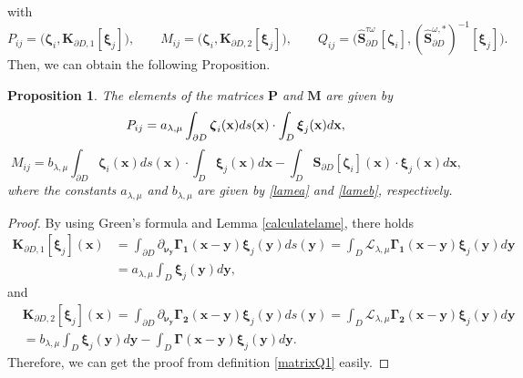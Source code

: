\documentclass[10pt,reqno,oneside]{amsart}%
\newtheorem{prop}{Proposition}[section]
\theoremstyle{definition}
\theoremstyle{remark}
\numberwithin{equation}{section}
\numberwithin{equation}{section}
\begin{document}
with
\begin{equation}\label{matrixQ1}
P_{ij}=\Big(\boldsymbol{\zeta}_i,\mathbf{K}_{\partial D,1}[\boldsymbol{\xi}_j]\Big),\quad\quad
M_{ij}=\Big(\boldsymbol{\zeta}_i,\mathbf{K}_{\partial D,2}[\boldsymbol{\xi}_j]\Big),\quad\quad
Q_{ij}=\Big(\hat{\mathbf{S}}_{\partial D}^{{\tau\omega} }[\boldsymbol{\zeta}_i],(\hat{\mathbf{S}}_{\partial D}^{{\omega},* })^{-1}[\boldsymbol{\xi}_j]\Big).
\end{equation}
Then, we can obtain the following Proposition.
\begin{prop}\label{matrices p and m}
The elements of the matrices $\mathbf{P}$ and $\mathbf{M}$ are given by
$$
P_{ij}=a_{\lambda,\mu}\int_{ \partial D}\boldsymbol{\zeta}_i(\mathbf{x})ds(\mathbf{x})\cdot \int_{ D}\boldsymbol{\xi}_j(\mathbf{x})d\mathbf{x},\quad\\
$$
$$
M_{ij}={b}_{\lambda,\mu}\int_{ \partial D}\boldsymbol{\zeta}_i(\mathbf{x})ds(\mathbf{x}) \cdot\int_{ D}\boldsymbol{\xi}_j(\mathbf{x})d\mathbf{x}
-\int_{ D} {\mathbf{S}}_{\partial D}[\boldsymbol{\zeta}_i](\mathbf{x}) \cdot \boldsymbol{\xi}_j(\mathbf{x}) d\mathbf{x},
$$
where the constants ${a}_{\lambda,\mu}$ and ${b}_{\lambda,\mu}$ are given by \eqref{lamea} and \eqref{lameb}, respectively.
\end{prop}
\begin{proof}
By using Green's formula and Lemma \ref{calculatelame}, there holds
\begin{align}
\mathbf{K}_{\partial D,1}[\boldsymbol{\xi}_j](\mathbf{x})&=\int_{\partial D}\partial_{\boldsymbol{\nu}_{\mathbf{y}}} \boldsymbol{\Gamma_1}(\mathbf{x}-\mathbf{y})\boldsymbol{\xi}_j(\mathbf{y})d s(\mathbf{y})=\int_{ D} \mathcal{L}_{\lambda,\mu} \boldsymbol{\Gamma_1}(\mathbf{x}-\mathbf{y})\boldsymbol{\xi}_j(\mathbf{y})d\mathbf{y}\nonumber\\
&=a_{\lambda,\mu}\int_{ D}\boldsymbol{\xi}_j(\mathbf{y})d\mathbf{y},\nonumber
\end{align}
and
\begin{align}
&\mathbf{K}_{\partial D,2}[\boldsymbol{\xi}_j](\mathbf{x})=\int_{\partial D}\partial_{\boldsymbol{\nu}_{\mathbf{y}}} \boldsymbol{\Gamma_2}(\mathbf{x}-\mathbf{y})\boldsymbol{\xi}_j(\mathbf{y})d s(\mathbf{y})=\int_{ D} \mathcal{L}_{\lambda,\mu} \boldsymbol{\Gamma_2}(\mathbf{x}-\mathbf{y})\boldsymbol{\xi}_j(\mathbf{y})d\mathbf{y}\nonumber\\
&=b_{\lambda,\mu}\int_{ D}\boldsymbol{\xi}_j(\mathbf{y})d\mathbf{y}-\int_{D}\boldsymbol{\Gamma}(\mathbf{x}-\mathbf{y})\boldsymbol{\xi}_j(\mathbf{y})d\mathbf{y}.\nonumber
\end{align}
Therefore, we can get the proof from definition \eqref{matrixQ1} easily.
\end{proof}
\end{document}
